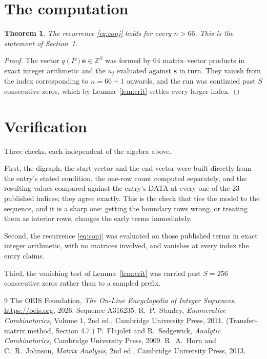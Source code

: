 \documentclass[11pt,a4paper]{article}
\theoremstyle{plain}
\newtheorem{theorem}{Theorem}
\theoremstyle{definition}
\begin{document}
\section{The computation}

\begin{theorem}
The recurrence \eqref{eq:conj} holds for every $n>66$. This is the statement of
Section~1.
\end{theorem}

\begin{proof}
The vector $q(P)\mathbf{e}\in\mathbb{Z}^{S}$ was formed by $64$ matrix--vector
products in exact integer arithmetic and the $u_j$ evaluated against $\mathbf{s}$ in turn.
They vanish from the index corresponding to $n=66+1$ onwards, and the run was continued
past $S$ consecutive zeros, which by Lemma~\ref{lem:crit} settles every larger index.
\end{proof}

\section{Verification}

Three checks, each independent of the algebra above.

First, the digraph, the start vector and the end vector were built directly from the
entry's stated condition, the one-row count computed separately, and the resulting values
compared against the entry's DATA at every one of the $23$ published indices; they
agree exactly. This is the check that ties the model to the sequence, and it is a sharp one:
getting the boundary rows wrong, or treating them as interior rows, changes the early terms
immediately.

Second, the recurrence \eqref{eq:conj} was evaluated on those published terms in exact
integer arithmetic, with no matrices involved, and vanishes at every index the entry claims.

Third, the vanishing test of Lemma~\ref{lem:crit} was carried past $S=256$ consecutive
zeros rather than to a sampled prefix.

\begin{thebibliography}{9}
 The OEIS Foundation, \emph{The On-Line Encyclopedia of Integer
Sequences}, \url{https://oeis.org}, 2026. Sequence A316235.
 R.~P.~Stanley, \emph{Enumerative Combinatorics}, Volume 1, 2nd ed.,
Cambridge University Press, 2011. (Transfer-matrix method, Section 4.7.)
 P.~Flajolet and R.~Sedgewick, \emph{Analytic Combinatorics}, Cambridge
University Press, 2009.
 R.~A.~Horn and C.~R.~Johnson, \emph{Matrix Analysis}, 2nd ed., Cambridge
University Press, 2013.
\end{thebibliography}
\end{document}
